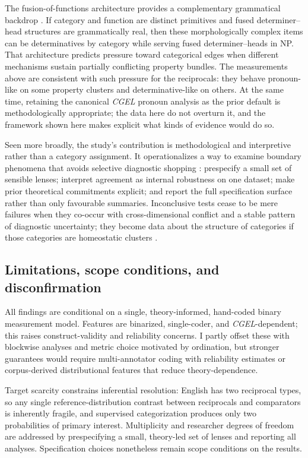 \documentclass[12pt]{article}
\begin{document}
The fusion-of-functions architecture provides a complementary grammatical backdrop \parencite{Payne2007}. If category and function are distinct primitives and fused determiner--head structures are grammatically real, then these morphologically complex items can be determinatives by category while serving fused determiner--heads in NP. That architecture predicts pressure toward categorical edges when different mechanisms sustain partially conflicting property bundles. The measurements above are consistent with such pressure for the reciprocals: they behave pronoun-like on some property clusters and determinative-like on others. At the same time, retaining the canonical \textit{CGEL} pronoun analysis as the prior default is methodologically appropriate; the data here do not overturn it, and the framework shown here makes explicit what kinds of evidence would do so.

Seen more broadly, the study's contribution is methodological and interpretive rather than a category assignment. It operationalizes a way to examine boundary phenomena that avoids selective diagnostic shopping \parencite{croft2001radical}: prespecify a small set of sensible lenses; interpret agreement as internal robustness on one dataset; make prior theoretical commitments explicit; and report the full specification surface rather than only favourable summaries. Inconclusive tests cease to be mere failures when they co-occur with cross-dimensional conflict and a stable pattern of diagnostic uncertainty; they become data about the structure of categories if those categories are homeostatic clusters \parencite{miller2021}.

\subsection{Limitations, scope conditions, and disconfirmation}

All findings are conditional on a single, theory-informed, hand-coded binary measurement model. Features are binarized, single-coder, and \textit{CGEL}-dependent; this raises construct-validity and reliability concerns. I partly offset these with blockwise analyses and metric choice motivated by ordination, but stronger guarantees would require multi-annotator coding with reliability estimates or corpus-derived distributional features that reduce theory-dependence.

Target scarcity constrains inferential resolution: English has two reciprocal types, so any single reference-distribution contrast between reciprocals and comparators is inherently fragile, and supervised categorization produces only two probabilities of primary interest. Multiplicity and researcher degrees of freedom are addressed by prespecifying a small, theory-led set of lenses and reporting all analyses. Specification choices nonetheless remain scope conditions on the results.
\end{document}
